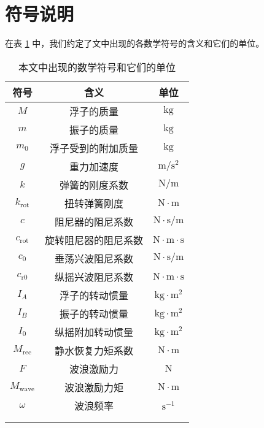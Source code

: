\section{符号说明}

在表 \ref{symbols} 中，我们约定了文中出现的各数学符号的含义和它们的单位。

\begin{center}
    \begin{longtable}{ccc}
        \toprule
        符号 & 含义 & 单位 \\
        \midrule
        $M$ & 浮子的质量 & $\mathrm{kg}$ \\
        $m$ & 振子的质量 & $\mathrm{kg}$ \\
        $m_0$ & 浮子受到的附加质量 & $\mathrm{kg}$ \\
        $g$ & 重力加速度 & $\mathrm{m}/\mathrm{s}^2$ \\
        $k$ & 弹簧的刚度系数 & $\mathrm{N}/\mathrm{m}$ \\
        $k_\text{rot}$ & 扭转弹簧刚度 & $\mathrm{N}\cdot\mathrm{m}$ \\
        $c$ & 阻尼器的阻尼系数 & $\mathrm{N}\cdot\mathrm{s}/\mathrm{m}$ \\
        $c_\text{rot}$ & 旋转阻尼器的阻尼系数 & $\mathrm{N}\cdot\mathrm{m}\cdot\mathrm{s}$ \\
        $c_0$ & 垂荡兴波阻尼系数 & $\mathrm{N}\cdot\mathrm{s}/\mathrm{m}$ \\ 
        $c_\text{r0}$ & 纵摇兴波阻尼系数 & $\mathrm{N}\cdot\mathrm{m}\cdot\mathrm{s}$ \\
        $I_A$ & 浮子的转动惯量 & $\mathrm{kg}\cdot\mathrm{m}^2$ \\
        $I_B$ & 振子的转动惯量 & $\mathrm{kg}\cdot\mathrm{m}^2$ \\
        $I_0$ & 纵摇附加转动惯量 & $\mathrm{kg}\cdot\mathrm{m}^2$ \\
        $M_\text{rec}$ & 静水恢复力矩系数 & $\mathrm{N}\cdot\mathrm{m}$ \\
        $F$ & 波浪激励力 & $\mathrm{N}$ \\
        $M_\text{wave}$ & 波浪激励力矩 & $\mathrm{N}\cdot\mathrm{m}$ \\
        $\omega$ & 波浪频率 & $\mathrm{s}^{-1}$ \\
        \bottomrule 
        \caption{本文中出现的数学符号和它们的单位} \\
        \label{symbols} \\
    \end{longtable}
\end{center}
